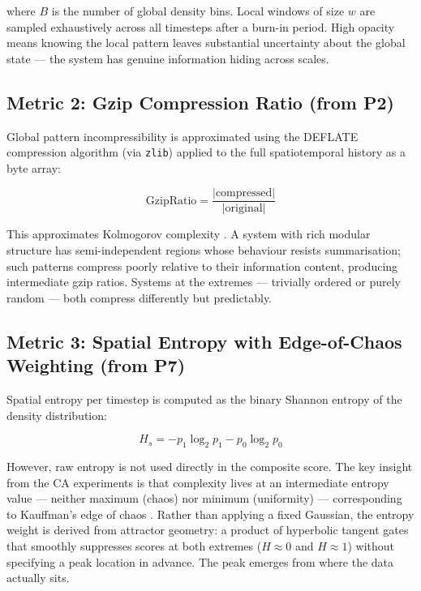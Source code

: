 \documentclass[12pt,a4paper]{article}
\begin{document}
where $B$ is the number of global density bins.
Local windows of size $w$ are sampled exhaustively across all timesteps
after a burn-in period.
High opacity means knowing the local pattern leaves substantial
uncertainty about the global state — the system has genuine information
hiding across scales.

\subsection{Metric 2: Gzip Compression Ratio (from P2)}

Global pattern incompressibility is approximated using the DEFLATE
compression algorithm (via \texttt{zlib}) applied to the full
spatiotemporal history as a byte array:

\begin{equation}
\text{GzipRatio} = \frac{|\text{compressed}|}{|\text{original}|}
\end{equation}

This approximates Kolmogorov complexity \citep{kolmogorov1965}.
A system with rich modular structure has semi-independent regions whose
behaviour resists summarisation; such patterns compress poorly relative
to their information content, producing intermediate gzip ratios.
Systems at the extremes — trivially ordered or purely random — both
compress differently but predictably.

\subsection{Metric 3: Spatial Entropy with Edge-of-Chaos Weighting (from P7)}

Spatial entropy per timestep is computed as the binary Shannon entropy
of the density distribution:

\begin{equation}
H_s = -p_1 \log_2 p_1 - p_0 \log_2 p_0
\end{equation}

However, raw entropy is not used directly in the composite score.
The key insight from the CA experiments is that complexity lives at an
intermediate entropy value — neither maximum (chaos) nor minimum
(uniformity) — corresponding to Kauffman's edge of chaos
\citep{kauffman1993}.
Rather than applying a fixed Gaussian, the entropy weight is derived
from attractor geometry: a product of hyperbolic tangent gates that
smoothly suppresses scores at both extremes ($H \approx 0$ and
$H \approx 1$) without specifying a peak location in advance.
The peak emerges from where the data actually sits.
\end{document}
